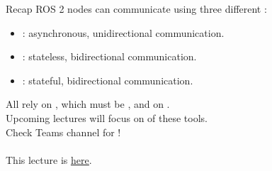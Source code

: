 
\begin{frame}{Recap}
  ROS 2 nodes can communicate using three different :
  \begin{itemize}
    \item {}: asynchronous, unidirectional communication.
    \item {}: stateless, bidirectional communication.
    \item {}: stateful, bidirectional communication.
  \end{itemize}
  \smallskip
  All rely on , which must be , and on .\\
  \bigskip
  Upcoming lectures will focus on  of these tools.\\
  Check Teams channel for !\\
  \bigskip
  \\
  \bigskip
  This lecture is \href{https://github.com/robmasocco/DAFN24_Robotics_5}{\color{blue}\underline{here}}.
\end{frame}
